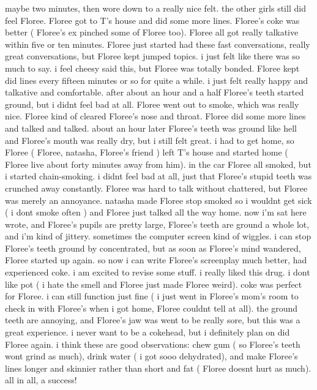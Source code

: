 \documentclass[12pt]{book}
\begin{document}
maybe two minutes, then wore down to a really nice felt. the other girls still did feel Floree. Floree got to T's house and did some more lines. Floree's coke was better ( Floree's ex pinched some of Floree too). Floree all got really talkative within five or ten minutes. Floree just started had these fast conversations, really great conversations, but Floree kept jumped topics. i just felt like there was so much to say. i feel cheesy said this, but Floree was totally bonded. Floree kept did lines every fifteen minutes or so for quite a while. i just felt really happy and talkative and comfortable. after about an hour and a half Floree's teeth started ground, but i didnt feel bad at all. Floree went out to smoke, which was really nice. Floree kind of cleared Floree's nose and throat. Floree did some more lines and talked and talked. about an hour later Floree's teeth was ground like hell and Floree's mouth was really dry, but i still felt great. i had to get home, so Floree ( Floree, natasha, Floree's friend ) left T's house and started home ( Floree live about forty minutes away from him). in the car Floree all smoked, but i started chain-smoking. i didnt feel bad at all, just that Floree's stupid teeth was crunched away constantly. Floree was hard to talk without chattered, but Floree was merely an annoyance. natasha made Floree stop smoked so i wouldnt get sick ( i dont smoke often ) and Floree just talked all the way home. now i'm sat here wrote, and Floree's pupils are pretty large, Floree's teeth are ground a whole lot, and i'm kind of jittery. sometimes the computer screen kind of wiggles. i can stop Floree's teeth ground by concentrated, but as soon as Floree's mind wandered, Floree started up again. so now i can write Floree's screenplay much better, had experienced coke. i am excited to revise some stuff. i really liked this drug. i dont like pot ( i hate the smell and Floree just made Floree weird). coke was perfect for Floree. i can still function just fine ( i just went in Floree's mom's room to check in with Floree's when i got home, Floree couldnt tell at all). the ground teeth are annoying, and Floree's jaw was went to be really sore, but this was a great experience. i never want to be a cokehead, but i definitely plan on did Floree again. i think these are good observations: chew gum ( so Floree's teeth wont grind as much), drink water ( i got sooo dehydrated), and make Floree's lines longer and skinnier rather than short and fat ( Floree doesnt hurt as much). all in all, a success!
\end{document}
